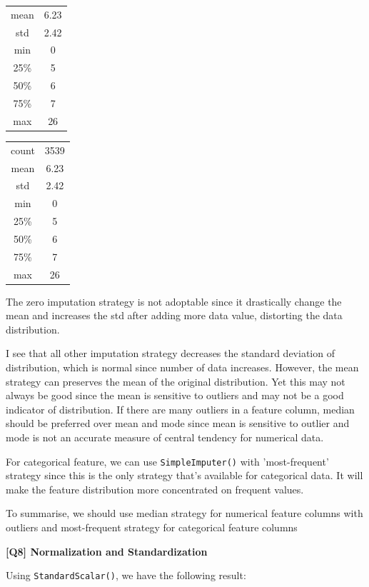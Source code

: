 \documentclass{article}
\begin{document}
\begin{description}
\begin{center}
\begin{tabular}{|c|c|}
			mean & 6.23 \\
			std & 2.42 \\
			min & 0 \\
			25\% & 5 \\
			50\% & 6 \\
			75\% & 7 \\
			max & 26 \\
			\hline
		\end{tabular}
		\begin{tabular}{|c|c|}
			\hline
			count & 3539 \\
			mean & 6.23 \\
			std & 2.42 \\
			min & 0 \\
			25\% & 5 \\
			50\% & 6 \\
			75\% & 7 \\
			max & 26 \\
			\hline
		\end{tabular}
	\end{center}
	The zero imputation strategy is not adoptable since it drastically change the mean and increases the std after adding more data value, distorting the data distribution.	

	I see that all other imputation strategy decreases the standard deviation of distribution, which is normal since number of data increases. However, the mean strategy can preserves the mean of the original distribution. Yet this may not always be good since the mean is sensitive to outliers and may not be a good indicator of distribution. If there are many outliers in a feature column, median should be preferred over mean and mode since mean is sensitive to outlier and mode is not an accurate measure of central tendency for numerical data.
	
	For categorical feature, we can use \texttt{SimpleImputer()} with 'most-frequent' strategy since this is the only strategy that's available for categorical data. It will make the feature distribution more concentrated on frequent values.

	To summarise, we should use median strategy for numerical feature columns with outliers and most-frequent strategy for categorical feature columns

\item \textbf{[Q8] Normalization and Standardization}

	Using \texttt{StandardScalar()}, we have the following result:


\end{description}
\end{document}
